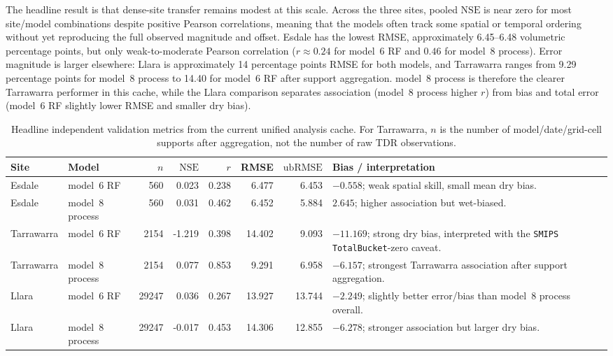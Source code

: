 \documentclass[11pt,a4paper]{article}
\newcommand{\nse}{\ensuremath{\mathrm{NSE}}}
\newcommand{\ubrmse}{\ensuremath{\mathrm{ubRMSE}}}
\newcommand{\pearsonr}{\ensuremath{r}}
\newcommand{\modelSix}{model~6 RF}
\newcommand{\modelEight}{model~8 process}
\newcommand{\smips}{\texttt{SMIPS TotalBucket}}
\begin{document}
The headline result is that dense-site transfer remains modest at this scale.
Across the three sites, pooled \nse{} is near zero for most site/model
combinations despite positive Pearson correlations, meaning that the models
often track some spatial or temporal ordering without yet reproducing the full
observed magnitude and offset.  Esdale has the lowest RMSE, approximately
6.45--6.48 volumetric percentage points, but only weak-to-moderate Pearson
correlation ($\pearsonr \approx 0.24$ for \modelSix{} and $0.46$ for
\modelEight{}).  Error magnitude is larger elsewhere: Llara is approximately
14 percentage points RMSE for both models, and Tarrawarra ranges from
9.29 percentage points for \modelEight{} to 14.40 for \modelSix{} after
support aggregation.  \modelEight{} is therefore the clearer Tarrawarra
performer in this cache, while the Llara comparison separates association
(\modelEight{} higher $\pearsonr$) from bias and total error (\modelSix{}
slightly lower RMSE and smaller dry bias).

\begin{table}[htbp]
\centering
\small
\caption{Headline independent validation metrics from the current unified
analysis cache.  For Tarrawarra, $n$ is the number of model/date/grid-cell
supports after aggregation, not the number of raw TDR observations.}
\label{tab:headline-metrics}
\begin{tabularx}{\textwidth}{llrrrrrX}
\toprule
Site & Model & $n$ & \nse{} & $\pearsonr$ & RMSE & \ubrmse{} & Bias / interpretation \\
\midrule
Esdale & \modelSix{} & 560 & 0.023 & 0.238 & 6.477 & 6.453
  & $-0.558$; weak spatial skill, small mean dry bias. \\
Esdale & \modelEight{} & 560 & 0.031 & 0.462 & 6.452 & 5.884
  & $2.645$; higher association but wet-biased. \\
Tarrawarra & \modelSix{} & 2154 & -1.219 & 0.398 & 14.402 & 9.093
  & $-11.169$; strong dry bias, interpreted with the \smips{}-zero caveat. \\
Tarrawarra & \modelEight{} & 2154 & 0.077 & 0.853 & 9.291 & 6.958
  & $-6.157$; strongest Tarrawarra association after support aggregation. \\
Llara & \modelSix{} & 29247 & 0.036 & 0.267 & 13.927 & 13.744
  & $-2.249$; slightly better error/bias than \modelEight{} overall. \\
Llara & \modelEight{} & 29247 & -0.017 & 0.453 & 14.306 & 12.855
  & $-6.278$; stronger association but larger dry bias. \\
\bottomrule
\end{tabularx}
\end{table}
\end{document}
